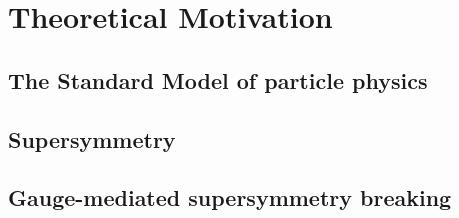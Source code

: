 \chapter{Theoretical Motivation}
\label{chap:theory}

\section{The Standard Model of particle physics}
\label{sec:StandardModel}

\section{Supersymmetry}
\label{sec:SUSY}

\section{Gauge-mediated supersymmetry breaking}
\label{sec:gmsb}

